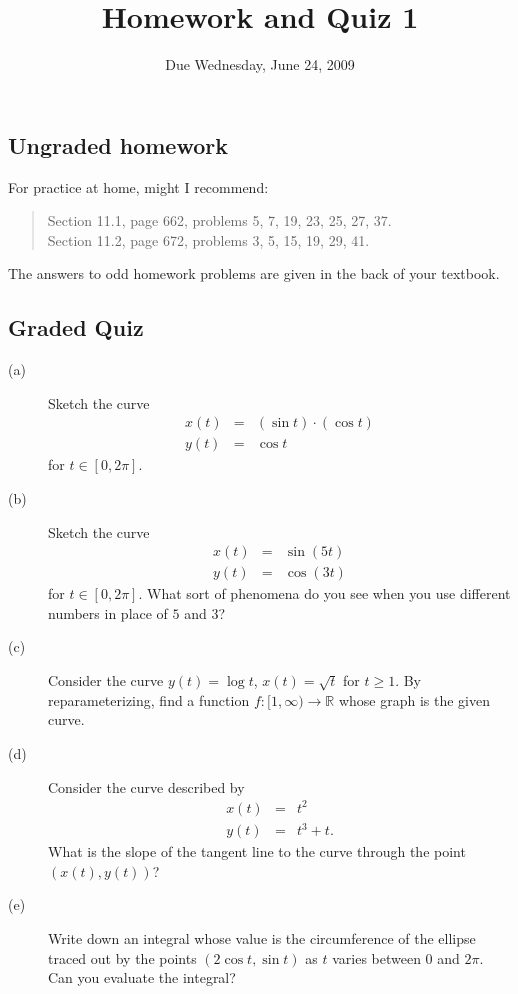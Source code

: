 \documentclass[12pt]{article}
\title{Homework and Quiz 1}
\date{Due Wednesday, June 24, 2009}
\newcommand{\R}{\mathbb{R}}
\begin{document}
\maketitle

\subsection*{Ungraded homework}

For practice at home, might I recommend:
\begin{quote}
Section 11.1, page 662, problems 5, 7, 19, 23, 25, 27, 37. \\
Section 11.2, page 672, problems 3, 5, 15, 19, 29, 41.
\end{quote}
The answers to odd homework problems are given in the back of your textbook.

\vfill

\subsection*{Graded Quiz}

\begin{description}
\item[(a)] Sketch the curve
\begin{eqnarray*}
x(t) &=& \left( \sin t \right) \cdot \left( \cos t \right) \\
y(t) &=& \cos t
\end{eqnarray*}
for $t \in [0,2\pi]$.
\vfill
\item[(b)] Sketch the curve
\begin{eqnarray*}
x(t) &=& \sin \left( 5t \right) \\
y(t) &=& \cos \left( 3t \right)
\end{eqnarray*}
for $t \in [0,2\pi]$.  What sort of phenomena do you see when you use different numbers in place of $5$ and $3$?
\vfill
\item[(c)] Consider the curve $y(t) = \log t$, $x(t) = \sqrt{t}$ for $t \geq 1$.  By reparameterizing, find a function $f : [1,\infty) \to \R$ whose graph is the given curve.
\vfill
\item[(d)] Consider the curve described by
\begin{eqnarray*}
x(t) &=& t^2 \\
y(t) &=& t^3 + t.
\end{eqnarray*}
What is the slope of the tangent line to the curve through the point $\left(x(t),y(t)\right)$?
\vfill
\item[(e)] Write down an integral whose value is the circumference of
  the ellipse traced out by the points $(2 \cos t,\sin t)$ as $t$
  varies between $0$ and $2\pi$.  Can you evaluate the integral?
\end{description}
\end{document}
